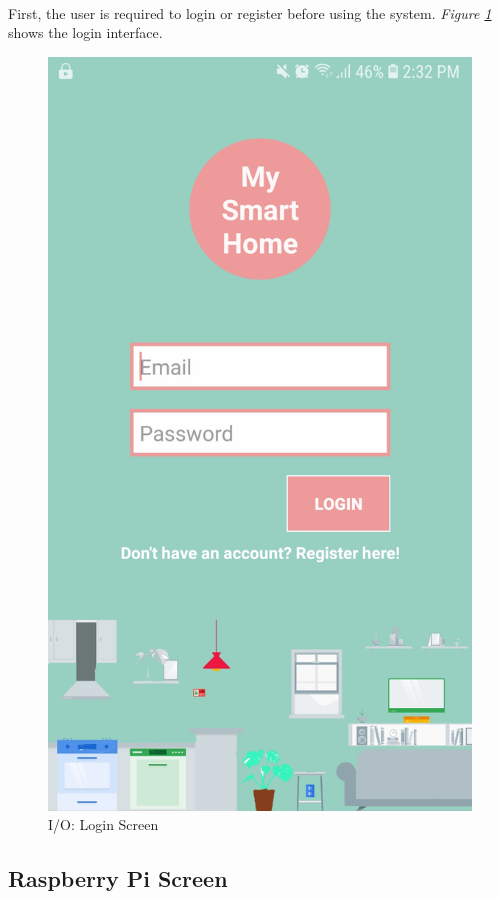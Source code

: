 \documentclass[12pt]{paper}
\begin{document}
		\paragraph{} First, the user is required to login or register before using the system. \textit{Figure \ref{output:login}} shows the login interface.
		\begin{figure}[H]
			\centering
			\includegraphics[width=.5\linewidth]{img/output_login.jpg}
			\caption{I/O: Login Screen}
			\label{output:login}
		\end{figure}
		
		\newpage\subsection{Raspberry Pi Screen}
\end{document}
